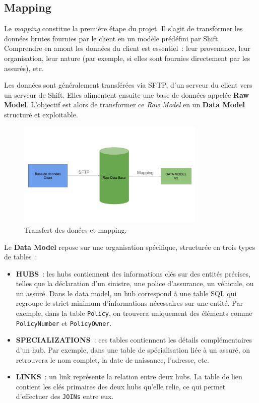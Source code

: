 \documentclass [twoside,openright,a4paper,11pt,french] {report}
\begin{document}
\subsection{Mapping}

Le \textit{mapping} constitue la première étape du projet. Il s'agit de transformer les données brutes fournies par le client en un modèle prédéfini par Shift.  
Comprendre en amont les données du client est essentiel~: leur provenance, leur organisation, leur nature (par exemple, si elles sont fournies directement par les assurés), etc.

Les données sont généralement transférées via SFTP, d'un serveur du client vers un serveur de Shift. Elles alimentent ensuite une base de données appelée \textbf{Raw Model}.  
L'objectif est alors de transformer ce \textit{Raw Model} en un \textbf{Data Model} structuré et exploitable.

\begin{figure}[htbp]
    \centering
    \includegraphics[width=0.80\textwidth]{Mapping.pdf}
    \caption{Transfert des donées et mapping.}
    \label{fig:entonnoir}
\end{figure}

Le \textbf{Data Model} repose sur une organisation spécifique, structurée en trois types de tables~:

\begin{itemize}
    \item \textbf{HUBS}~: les hubs contiennent des informations clés sur des entités précises, telles que la déclaration d'un sinistre, une police d'assurance, un véhicule, ou un assuré.  
    Dans le data model, un hub correspond à une table SQL qui regroupe le strict minimum d'informations nécessaires sur une entité.  
    Par exemple, dans la table \texttt{Policy}, on trouvera uniquement des éléments comme \texttt{PolicyNumber} et \texttt{PolicyOwner}.

    \item \textbf{SPECIALIZATIONS}~: ces tables contiennent les détails complémentaires d'un hub.  
    Par exemple, dans une table de spécialisation liée à un assuré, on retrouvera le nom complet, la date de naissance, l'adresse, etc.

    \item \textbf{LINKS}~: un link représente la relation entre deux hubs.  
    La table de lien contient les clés primaires des deux hubs qu'elle relie, ce qui permet d'effectuer des \texttt{JOINs} entre eux.
\end{itemize}
\end{document}
